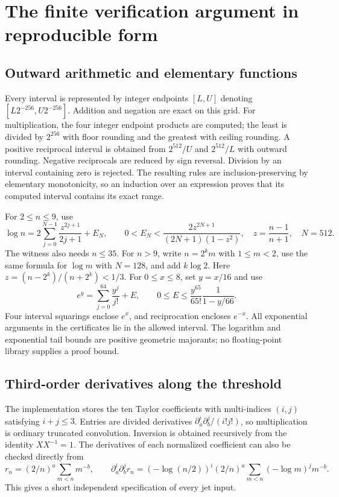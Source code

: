 \documentclass[11pt,a4paper]{article}
\theoremstyle{definition}\newtheorem{definition}[theorem]{Definition}
\theoremstyle{remark}\newtheorem{remark}[theorem]{Remark}
\numberwithin{equation}{section}
\begin{document}
\appendix
\section{The finite verification argument in reproducible form}
\label{rbif:app:verification}
\subsection{Outward arithmetic and elementary functions}
Every interval is represented by integer endpoints $[L,U]$ denoting
$[L2^{-256},U2^{-256}]$. Addition and negation are exact on this grid.
For multiplication, the four integer endpoint products are computed;
the least is divided by $2^{256}$ with floor rounding and the greatest
with ceiling rounding. A positive reciprocal interval is obtained from
$2^{512}/U$ and $2^{512}/L$ with outward rounding. Negative reciprocals
are reduced by sign reversal. Division by an interval containing zero
is rejected. The resulting rules are inclusion-preserving by elementary
monotonicity, so an induction over an expression proves that its
computed interval contains its exact range.

For $2\le n\le9$, use
\begin{equation}
 \log n=2\sum_{j=0}^{N-1}\frac{z^{2j+1}}{2j+1}+E_N,\qquad
 0<E_N<\frac{2z^{2N+1}}{(2N+1)(1-z^2)},\quad
 z=\frac{n-1}{n+1},\quad N=512.
 \label{rbif:eq:logtail}
\end{equation}
The witness also needs $n\le35$. For $n>9$, write $n=2^km$ with
$1\le m<2$, use the same formula for $\log m$ with $N=128$, and add
$k\log2$. Here $z=(n-2^k)/(n+2^k)<1/3$.
For $0\le x\le8$, set $y=x/16$ and use
\begin{equation}
 e^y=\sum_{j=0}^{64}\frac{y^j}{j!}+E,\qquad
 0\le E\le\frac{y^{65}}{65!}\frac1{1-y/66}.
 \label{rbif:eq:exptail}
\end{equation}
Four interval squarings enclose $e^x$, and reciprocation encloses
$e^{-x}$. All exponential arguments in the certificates lie in the
allowed interval. The logarithm and exponential tail bounds are positive
geometric majorants; no floating-point library supplies a proof bound.

\subsection{Third-order derivatives along the threshold}
The implementation stores the ten Taylor coefficients with multi-indices
$(i,j)$ satisfying $i+j\le3$. Entries are divided derivatives
$\partial_a^i\partial_b^j/(i!j!)$, so multiplication is ordinary truncated
convolution. Inversion is obtained recursively from the identity
$XX^{-1}=1$. The derivatives of each normalized coefficient can also
be checked directly from
\[
 r_n=(2/n)^a\sum_{m<n}m^{-b},\qquad
 \partial_a^i\partial_b^j r_n
 =(-\log(n/2))^i(2/n)^a\sum_{m<n}(-\log m)^j m^{-b}.
\]
This gives a short independent specification of every jet input.
\end{document}

